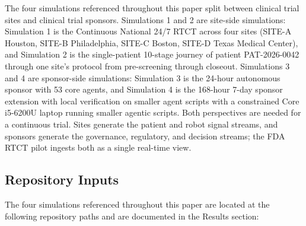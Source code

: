 The four simulations referenced throughout this paper split between
clinical trial sites and clinical trial sponsors. Simulations 1 and 2
are site-side simulations: Simulation 1 is the Continuous National
24/7 RTCT across four sites (SITE-A Houston, SITE-B Philadelphia,
SITE-C Boston, SITE-D Texas Medical Center), and Simulation 2 is the
single-patient 10-stage journey of patient PAT-2026-0042 through one
site's protocol from pre-screening through closeout. Simulations 3
and 4 are sponsor-side simulations: Simulation 3 is the 24-hour
autonomous sponsor with 53 core agents, and Simulation 4 is the
168-hour 7-day sponsor extension with local verification on smaller agent scripts with a
constrained Core i5-6200U laptop running smaller agentic scripts. Both perspectives are needed for a
continuous trial. Sites generate the patient and robot signal streams,
and sponsors generate the governance, regulatory, and decision
streams; the FDA RTCT pilot ingests both as a single real-time view.

\subsection{Repository Inputs}
\label{sec:methods-inputs}

The four simulations referenced throughout this paper are located at
the following repository paths and are documented in the Results
section:

